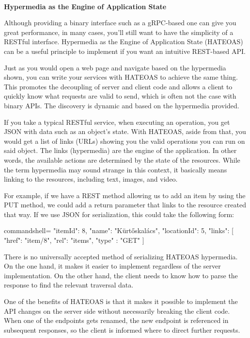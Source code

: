 \hspace*{\fill} \\ %
\noindent
\textbf{Hypermedia as the Engine of Application State}

Although providing a binary interface such as a gRPC-based one can give you great performance, in many cases, you'll still want to have the simplicity of a RESTful interface. Hypermedia as the Engine of Application State (HATEOAS) can be a useful principle to implement if you want an intuitive REST-based API.

Just as you would open a web page and navigate based on the hypermedia shown, you can write your services with HATEOAS to achieve the same thing. This promotes the decoupling of server and client code and allows a client to quickly know what requests are valid to send, which is often not the case with binary APIs. The discovery is dynamic and based on the hypermedia provided.

If you take a typical RESTful service, when executing an operation, you get JSON with data such as an object's state. With HATEOAS, aside from that, you would get a list of links (URLs) showing you the valid operations you can run on said object. The links (hypermedia) are the engine of the application. In other words, the available actions are determined by the state of the resources. While the term hypermedia may sound strange in this context, it basically means linking to the resources, including text, images, and video.

For example, if we have a REST method allowing us to add an item by using the PUT method, we could add a return parameter that links to the resource created that way. If we use JSON for serialization, this could take the following form:

\begin{tcblisting}{commandshell={}}
{
  "itemId": 8,
  "name": "Kürtőskalács",
  "locationId": 5,
  "links": [
    {
      "href": "item/8",
      "rel": "items",
      "type" : "GET"
    }
  ]
}
\end{tcblisting}

There is no universally accepted method of serializing HATEOAS hypermedia. On the one hand, it makes it easier to implement regardless of the server implementation. On the other hand, the client needs to know how to parse the response to find the relevant traversal data.

One of the benefits of HATEOAS is that it makes it possible to implement the API changes on the server side without necessarily breaking the client code. When one of the endpoints gets renamed, the new endpoint is referenced in subsequent responses, so the client is informed where to direct further requests.

